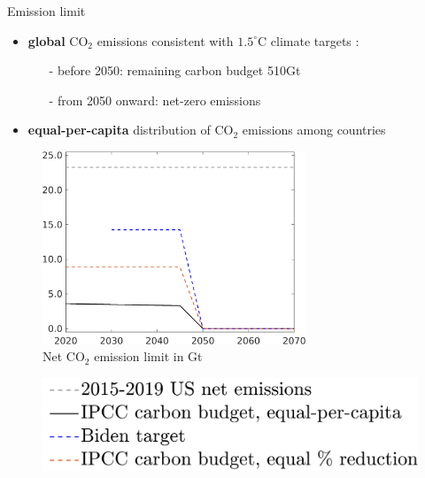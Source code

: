 \documentclass[11pt,aspectratio=169]{beamer}
\begin{document}
\addtocounter{framenumber}{-1}
\begin{frame}{Emission limit}
\vspace{-1mm}
\begin{itemize}
	\item  \textbf{global} CO$_2$ emissions consistent with $1.5^\circ$C climate targets \footnotesize{\citep{IPCC2022}}:
	\vspace{1mm}
	\begin{itemize}
		\item[-] before 2050: remaining carbon budget 510Gt
		\item[-] from 2050 onward: net-zero  emissions
	\end{itemize}
	\vspace{0mm}
	\item \textbf{equal-per-capita} distribution of  CO$_2$ emissions among countries 
\end{itemize}
\vspace{-2mm}

\begin{center}
	\begin{minipage}{0.6\textwidth}
		\begin{figure}
			\caption{Net CO$_2$ emission limit in Gt}
			\includegraphics[width=0.7\textwidth]{../codding_model/own_basedOnFried/optimalPol_010922_revision/figures/all_13Sept22_Tplus30/Emnet_goals_o1_lgd0.png}
		\end{figure}
	\end{minipage}
	\hspace{-10mm}
	\begin{minipage}{0.3\textwidth}
		\begin{figure}
			\includegraphics[width=1.4\textwidth]{../codding_model/own_basedOnFried/optimalPol_010922_revision/figures/all_13Sept22_Tplus30/Emnet_goals_Legend_cropped.png}
		\end{figure}
	\end{minipage}
\end{center}
\end{frame}
\end{document}

